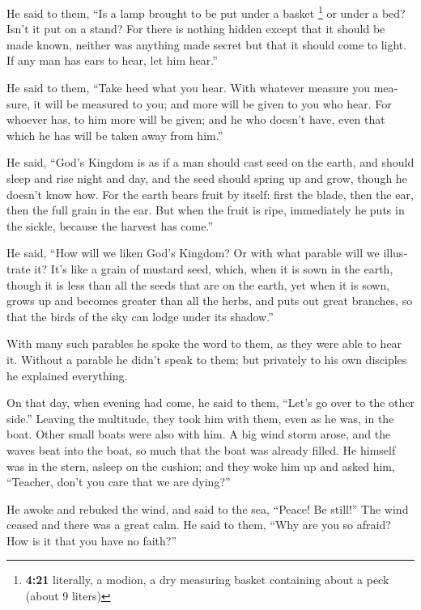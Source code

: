 \begin{paracol}{2}
\begin{otherlanguage}{english}
 He said to them, ``Is a lamp brought to be put under a
basket \footnote{\textbf{4:21} literally, a modion, a dry measuring
  basket containing about a peck (about 9 liters)} or under a bed? Isn't
it put on a stand?  For there is nothing hidden except
that it should be made known, neither was anything made secret but that
it should come to light.  If any man has ears to hear,
let him hear.''

 He said to them, ``Take heed what you hear. With
whatever measure you measure, it will be measured to you; and more will
be given to you who hear.  For whoever has, to him more
will be given; and he who doesn't have, even that which he has will be
taken away from him.''

 He said, ``God's Kingdom is as if a man should cast seed
on the earth,  and should sleep and rise night and day,
and the seed should spring up and grow, though he doesn't know how.
 For the earth bears fruit by itself: first the blade,
then the ear, then the full grain in the ear.  But when
the fruit is ripe, immediately he puts in the sickle, because the
harvest has come.''

 He said, ``How will we liken God's Kingdom? Or with what
parable will we illustrate it?  It's like a grain of
mustard seed, which, when it is sown in the earth, though it is less
than all the seeds that are on the earth,  yet when it is
sown, grows up and becomes greater than all the herbs, and puts out
great branches, so that the birds of the sky can lodge under its
shadow.''

 With many such parables he spoke the word to them, as
they were able to hear it.  Without a parable he didn't
speak to them; but privately to his own disciples he explained
everything.

 On that day, when evening had come, he said to them,
``Let's go over to the other side.''  Leaving the
multitude, they took him with them, even as he was, in the boat. Other
small boats were also with him.  A big wind storm arose,
and the waves beat into the boat, so much that the boat was already
filled.  He himself was in the stern, asleep on the
cushion; and they woke him up and asked him, ``Teacher, don't you care
that we are dying?''

 He awoke and rebuked the wind, and said to the sea,
``Peace! Be still!'' The wind ceased and there was a great calm.
 He said to them, ``Why are you so afraid? How is it that
you have no faith?''


\end{otherlanguage}
\end{paracol}
